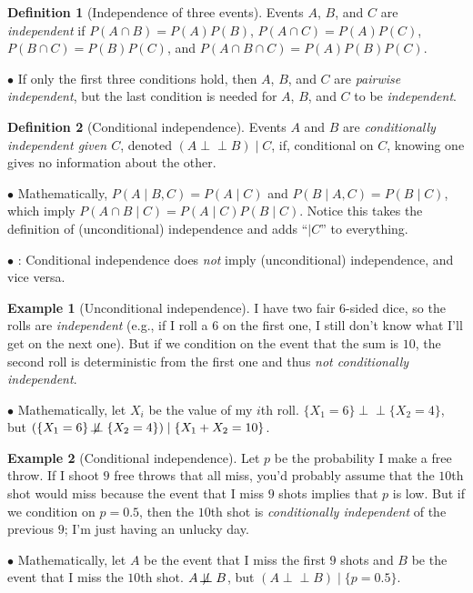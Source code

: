 \documentclass[12pt,oneside]{article}
\newcommand{\indep}{\perp\!\!\!\perp}
\newcommand{\notindep}{\mathrel{\not\!\perp\!\!\!\perp}}
\newcommand{\warning}{\textbf{\Biohazard}: }
\theoremstyle{definition}
\newtheorem{definition}{Definition}
\newtheorem{example}{Example}
\theoremstyle{remark}
\begin{document}
\begin{definition}[Independence of three events]
Events $A$, $B$, and $C$ are \textit{independent} if $P(A \cap B) = P(A) P(B)$, $P(A \cap C) = P(A) P(C)$, $P(B \cap C) = P(B) P(C)$, and $P(A \cap B \cap C) = P(A) P(B) P(C)$.

$\bullet$ If only the first three conditions hold, then $A$, $B$, and $C$ are \textit{pairwise independent}, but the last condition is needed for $A$, $B$, and $C$ to be \textit{independent}.
\end{definition}

\begin{definition}[Conditional independence]
Events $A$ and $B$ are \textit{conditionally independent given $C$}, denoted $(A \indep B) \mid C$, if, conditional on $C$, knowing one gives no information about the other.

$\bullet$ Mathematically, $P(A \mid B, C) = P(A \mid C)$ and $P(B \mid A, C) = P(B \mid C)$, which imply $P(A \cap B \mid C) = P(A \mid C) P(B \mid C)$. Notice this takes the definition of (unconditional) independence and adds \enquote{$\mid C$} to everything.

$\bullet$ \warning Conditional independence does \textit{not} imply (unconditional) independence, and vice versa.
\end{definition}

\begin{example}[Unconditional independence]
I have two fair $6$-sided dice, so the rolls are \textit{independent} (e.g., if I roll a $6$ on the first one, I still don't know what I'll get on the next one). But if we condition on the event that the sum is $10$, the second roll is deterministic from the first one and thus \textit{not conditionally independent}.

$\bullet$ Mathematically, let $X_i$ be the value of my $i$th roll. $\{X_1 = 6\} \indep \{X_2 = 4\}$, but $(\{X_1 = 6\} \notindep \{X_2 = 4\}) \mid \{X_1 + X_2 = 10\}$.
\end{example}

\begin{example}[Conditional independence]
Let $p$ be the probability I make a free throw. If I shoot $9$ free throws that all miss, you'd probably assume that the $10$th shot would miss because the event that I miss $9$ shots implies that $p$ is low. But if we condition on $p = 0.5$, then the $10$th shot is \textit{conditionally independent} of the previous $9$; I'm just having an unlucky day.

$\bullet$ Mathematically, let $A$ be the event that I miss the first $9$ shots and $B$ be the event that I miss the $10$th shot. $A \notindep B$, but $(A \indep B) \mid \{p = 0.5\}$.
\end{example}
\end{document}
